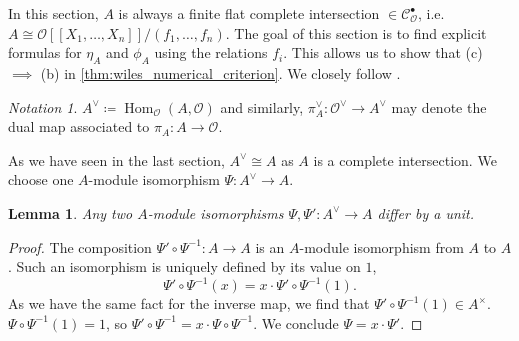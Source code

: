 \documentclass{article}
\theoremstyle{plain}%
\newtheorem{lemma}[theorem]{Lemma}
\theoremstyle{definition}
\theoremstyle{remark}
\newtheorem*{notation}{Notation}
\newcommand{\cob}{\mathcal{C}_\mathcal{O}^\bullet}
\renewcommand{\hom}{\operatorname{Hom}}
\begin{document}
In this section, \(A\) is always a finite flat complete intersection \(\in \cob\), 
i.e. \(A \cong \mathcal{O}[[X_1, \dots, X_n]]/(f_1, \dots, f_n)\).
The goal of this section is to find explicit formulas for \(\eta_A\) and \(\phi_A\) using
the relations \(f_i\). This allows us to show that (c) \(\implies\) (b) in \cref{thm:wiles_numerical_criterion}.
We closely follow \cite[chapter 5.4]{Darmon1995}.
\begin{notation}
    \(A^\vee \coloneqq \hom_\mathcal{O}(A, \mathcal{O})\) and similarly, \(\pi_A^\vee \colon \mathcal{O}^\vee \to A^\vee\) 
    may denote the dual map associated to \(\pi_A\colon A \to \mathcal{O}\).
\end{notation}
As we have seen in the last section, \(A^\vee \cong A\) as \(A\) is a complete intersection.
We choose one \(A\)-module isomorphism \(\Psi\colon A^\vee \to A\).
\begin{lemma}
    Any two \(A\)-module isomorphisms \(\Psi, \Psi' \colon A^\vee \to A\) differ by a unit.
\end{lemma}
\begin{proof}
    The composition \(\Psi' \circ \Psi^{-1} \colon A \to A\) is an \(A\)-module isomorphism from \(A\) to \(A\).
    Such an isomorphism is uniquely defined by its value on \(1\),
    \[
        \Psi' \circ \Psi^{-1}(x) = x \cdot \Psi' \circ \Psi^{-1}(1).
    \]
    As we have the same fact for the inverse map, we find that \(\Psi' \circ \Psi^{-1}(1) \in A^\times\).
    \(\Psi \circ \Psi^{-1}(1) = 1\), so \(\Psi' \circ \Psi^{-1} = x \cdot \Psi \circ \Psi^{-1}\).
    We conclude \(\Psi = x \cdot \Psi'\).
\end{proof}
\end{document}
